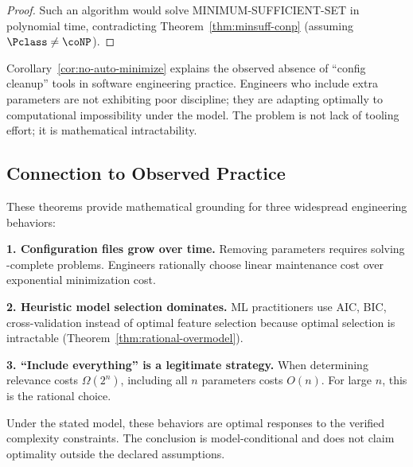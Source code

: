 \begin{proof}
Such an algorithm would solve MINIMUM-SUFFICIENT-SET in polynomial time, contradicting Theorem~\ref{thm:minsuff-conp} (assuming $\Pclass \neq \coNP$).
\end{proof}

\begin{remark}
Corollary~\ref{cor:no-auto-minimize} explains the observed absence of ``config cleanup'' tools in software engineering practice. Engineers who include extra parameters are not exhibiting poor discipline; they are adapting optimally to computational impossibility under the model. The problem is not lack of tooling effort; it is mathematical intractability.
\end{remark}

\subsection{Connection to Observed Practice}

These theorems provide mathematical grounding for three widespread engineering behaviors:

\textbf{1. Configuration files grow over time.} Removing parameters requires solving \coNP-complete problems. Engineers rationally choose linear maintenance cost over exponential minimization cost.

\textbf{2. Heuristic model selection dominates.} ML practitioners use AIC, BIC, cross-validation instead of optimal feature selection because optimal selection is intractable (Theorem~\ref{thm:rational-overmodel}).

\textbf{3. ``Include everything'' is a legitimate strategy.} When determining relevance costs $\Omega(2^n)$, including all $n$ parameters costs $O(n)$. For large $n$, this is the rational choice.

Under the stated model, these behaviors are optimal responses to the verified complexity constraints. The conclusion is model-conditional and does not claim optimality outside the declared assumptions.
